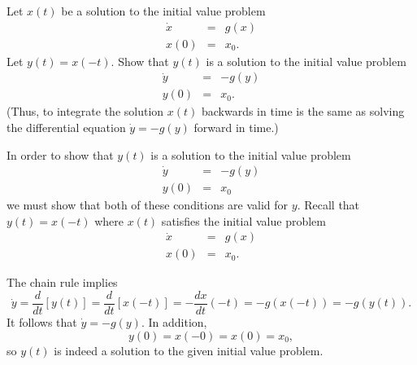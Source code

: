 \documentclass{ximera}
\begin{document}
\begin{computerExercise} \label{c3.3.7}
Let $x(t)$ be a solution to the initial value problem
\begin{eqnarray*}
\dot{x} & = & g(x) \\
x(0) & = & x_0.
\end{eqnarray*}
Let $y(t)=x(-t)$.  Show that $y(t)$ is a solution to the
initial value problem
\begin{eqnarray*}
\dot{y} & = & -g(y) \\
y(0) & = & x_0.
\end{eqnarray*}
(Thus, to integrate the solution $x(t)$ backwards in time is the
same as solving the differential equation $\dot{y}  =  -g(y)$
forward in time.)

\begin{solution}

In order to show that $y(t)$ is a solution to the initial value problem
\[
\begin{array}{rcl}
\dot{y} & = & -g(y) \\
y(0) & = & x_0\end{array}
\]
we must show that both of these conditions are valid for $y$.  Recall that
$y(t) = x(-t)$ where $x(t)$ satisfies the initial value problem
\[ \begin{array}{rcl}
\dot{x} & = & g(x) \\
x(0) & = & x_0.\end{array} \]

The chain rule implies
\[ \dot{y} = \frac{d}{dt}[y(t)] = \frac{d}{dt}[x(-t)] =
-\frac{dx}{dt}(-t) = -g(x(-t)) = -g(y(t)). \]
It follows that $\dot y = -g(y)$.
In addition,
\[ y(0) = x(-0) = x(0) = x_0, \]
so $y(t)$ is indeed a solution to the given initial value problem.

\end{solution}
\end{computerExercise}
\end{document}
